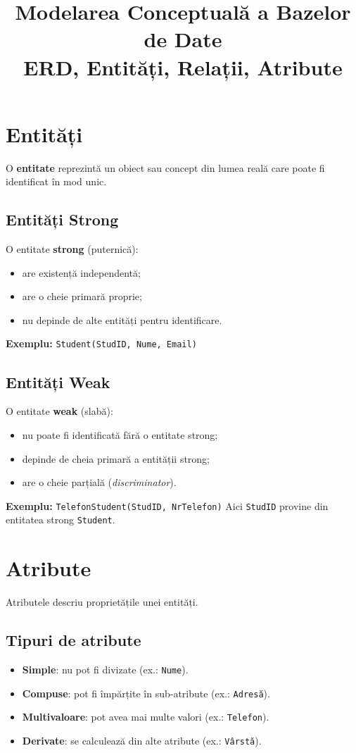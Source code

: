 \documentclass[12pt,a4paper]{article}
\title{Modelarea Conceptuală a Bazelor de Date \\ ERD, Entități, Relații, Atribute}
\author{}
\date{}
\begin{document}
\maketitle

\section{Entități}
O \textbf{entitate} reprezintă un obiect sau concept din lumea reală care poate fi
identificat în mod unic.

\subsection*{Entități Strong}
O entitate \textbf{strong} (puternică):
\begin{itemize}[noitemsep]
    \item are existență independentă;
    \item are o cheie primară proprie;
    \item nu depinde de alte entități pentru identificare.
\end{itemize}

\textbf{Exemplu:} \texttt{Student(StudID, Nume, Email)}

\subsection*{Entități Weak}
O entitate \textbf{weak} (slabă):
\begin{itemize}[noitemsep]
    \item nu poate fi identificată fără o entitate strong;
    \item depinde de cheia primară a entității strong;
    \item are o cheie parțială (\textit{discriminator}).
\end{itemize}

\textbf{Exemplu:} \texttt{TelefonStudent(StudID, NrTelefon)}  
Aici \texttt{StudID} provine din entitatea strong \texttt{Student}.

\section{Atribute}
Atributele descriu proprietățile unei entități.

\subsection*{Tipuri de atribute}
\begin{itemize}[noitemsep]
    \item \textbf{Simple}: nu pot fi divizate (ex.: \texttt{Nume}).
    \item \textbf{Compuse}: pot fi împărțite în sub-atribute (ex.: \texttt{Adresă}).
    \item \textbf{Multivaloare}: pot avea mai multe valori (ex.: \texttt{Telefon}).
    \item \textbf{Derivate}: se calculează din alte atribute (ex.: \texttt{Vârstă}).
\end{itemize}
\end{document}
